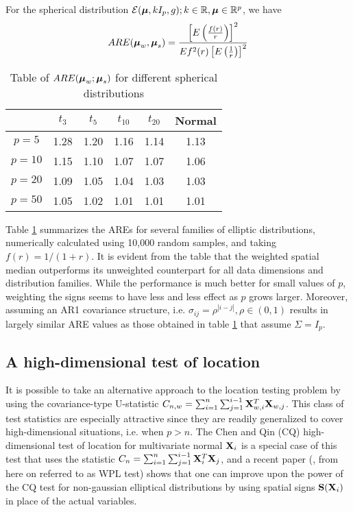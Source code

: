 \documentclass[fleqn,11pt]{article}
\begin{document}
\begin{Corollary}
For the spherical distribution $\mathcal{E}({\boldsymbol{\mu}}, kI_p, g); k \in \mathbb R, {\boldsymbol{\mu}} \in \mathbb R^p$, we have
%
$$
ARE( {\boldsymbol{\mu}}_w, {\boldsymbol{\mu}}_s) = \frac{ \left[ E \left( \frac{f(r)}{r} \right) \right]^2}{Ef^2(r) \left[ E \left( \frac{1}{r} \right) \right]^2 }
$$
\end{Corollary}
%
\begin{table}[t]
	\centering
    \begin{tabular}{c|ccccc}
    \hline
    & $t_3$   & $t_5$   & $t_{10}$  & $t_{20}$  & Normal \\ \hline
    $p=5$    & 1.28 & 1.20 & 1.16 & 1.14 & 1.13   \\
    $p=10$   & 1.15 & 1.10 & 1.07 & 1.07 & 1.06   \\
    $p=20$   & 1.09 & 1.05 & 1.04 & 1.03 & 1.03   \\
    $p=50$   & 1.05 & 1.02 & 1.01 & 1.01 & 1.01   \\ \hline
    \end{tabular}
    \caption{Table of $ARE({\boldsymbol{\mu}}_w; {\boldsymbol{\mu}}_s)$ for different spherical distributions}
    \label{table:AREtablewsm}
\end{table}
%
Table \ref{table:AREtablewsm} summarizes the AREs for several families of elliptic distributions, numerically calculated using 10,000 random samples, and taking $f(r) = 1/(1+r)$. It is evident from the table that the weighted spatial median outperforms its unweighted counterpart for all data dimensions and distribution families. While the performance is much better for small values of $p$, weighting the signs seems to have less and less effect as $p$ grows larger. Moreover, assuming an AR1 covariance structure, i.e. $\sigma_{ij} = \rho^{|i-j|}, \rho \in (0,1)$ results in largely similar ARE values as those obtained in table \ref{table:AREtablewsm} that assume $\Sigma = I_p$.

\subsection{A high-dimensional test of location}

It is possible to take an alternative approach to the location testing problem by using the covariance-type U-statistic $C_{n,w} = \sum_{i=1}^n \sum_{j=1}^{i-1} {\mathbf{X}}_{w,i}^T {\mathbf{X}}_{w,j}$. This class of test statistics are especially attractive since they are readily generalized to cover high-dimensional situations, i.e. when $p > n$. The Chen and Qin (CQ) high-dimensional test of location for multivariate normal ${\mathbf{X}}_i$ \citep{ChenQin10} is a special case of this test that uses the statistic $C_n = \sum_{i=1}^n \sum_{j=1}^{i-1} {\mathbf{X}}_i^T {\mathbf{X}}_j$, and a recent paper (\citep{WangPengLi15}, from here on referred to as WPL test) shows that one can improve upon the power of the CQ test for non-gaussian elliptical distributions by using spatial signs ${\mathbf{S}}({\mathbf{X}}_i)$ in place of the actual variables.
\end{document}
